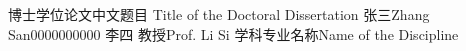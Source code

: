 \setthesisinfo
  {博士学位论文中文题目}
  {Title of the Doctoral Dissertation}
  {张三}{Zhang San}{0000000000}
  {李四 教授}{Prof. Li Si}
  {学科专业名称}{Name of the Discipline}
\newcommand{\thesistitlezhcover}{博士学位论文\\中文题目}
\renewcommand{\thesisschool}{培养学院名称}
\renewcommand{\thesisdirection}{学科方向名称}
\renewcommand{\thesistype}{学术型/专业型} %
\renewcommand{\thesischair}{王五 教授}
\renewcommand{\thesiscommittee}{王五 教授\\赵六 教授\\孙七 教授\\周八 教授}
\renewcommand{\completiondate}{20XX 年 X 月 X 日}
\renewcommand{\defensedate}{20XX 年 X 月 X 日}
\renewcommand{\submitdate}{20XX 年 X 月 X 日}
\confidentialtrue
\newif\ifbistuformatnotes
\bistuformatnotesfalse

